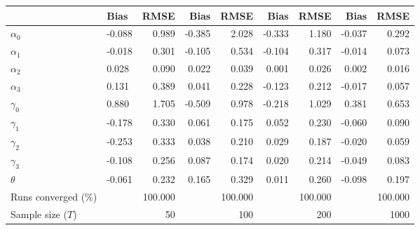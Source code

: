 
\begin{tabular}[t]{llrrrrrrr}
\toprule
  & Bias & RMSE & Bias & RMSE & Bias & RMSE & Bias & RMSE\\
\midrule
$\alpha_{0}$ & -0.088 & 0.989 & -0.385 & 2.028 & -0.333 & 1.180 & -0.037 & 0.292\\
$\alpha_{1}$ & -0.018 & 0.301 & -0.105 & 0.534 & -0.104 & 0.317 & -0.014 & 0.073\\
$\alpha_{2}$ & 0.028 & 0.090 & 0.022 & 0.039 & 0.001 & 0.026 & 0.002 & 0.016\\
$\alpha_{3}$ & 0.131 & 0.389 & 0.041 & 0.228 & -0.123 & 0.212 & -0.017 & 0.057\\
$\gamma_{0}$ & 0.880 & 1.705 & -0.509 & 0.978 & -0.218 & 1.029 & 0.381 & 0.653\\
$\gamma_{1}$ & -0.178 & 0.330 & 0.061 & 0.175 & 0.052 & 0.230 & -0.060 & 0.090\\
$\gamma_{2}$ & -0.253 & 0.333 & 0.038 & 0.210 & 0.029 & 0.187 & -0.020 & 0.059\\
$\gamma_{3}$ & -0.108 & 0.256 & 0.087 & 0.174 & 0.020 & 0.214 & -0.049 & 0.083\\
$\theta$ & -0.061 & 0.232 & 0.165 & 0.329 & 0.011 & 0.260 & -0.098 & 0.197\\
Runs converged (\%) &  & 100.000 &  & 100.000 &  & 100.000 &  & 100.000\\
Sample size ($T$) &  & 50 &  & 100 &  & 200 &  & 1000\\
\bottomrule
\end{tabular}
